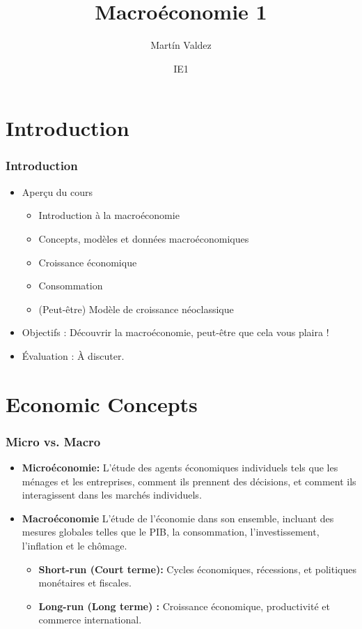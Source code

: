 \documentclass{beamer}
\title{Macroéconomie 1}
\author{Mart\'in Valdez}
\date{IE1}
\begin{document}
\begin{frame}
\titlepage
\end{frame}



\section{Introduction}
\begin{frame}
    \frametitle{Introduction}
    \begin{itemize}
        \item Aperçu du cours
        \begin{itemize}
            \item Introduction à la macroéconomie
            \item Concepts, modèles et données macroéconomiques
            \item Croissance économique
            \item Consommation
            \item (Peut-être) Modèle de croissance néoclassique
        \end{itemize}
        \item Objectifs : Découvrir la macroéconomie, peut-être que cela vous plaira !
        \item Évaluation : À discuter.
    \end{itemize}
\end{frame}
\section{Economic Concepts}
\begin{frame}
\frametitle{Micro vs. Macro}
\begin{itemize}
    \item \textbf{Microéconomie:}
    L'étude des agents économiques individuels tels que les ménages et les entreprises,
    comment ils prennent des décisions, et comment ils interagissent dans les marchés individuels.
    \pause
    \item \textbf{Macroéconomie}
    L'étude de l'économie dans son ensemble, incluant des mesures globales telles que
    le PIB, la consommation, l'investissement, l'inflation et le chômage.
    \begin{itemize}
        \item \textbf{Short-run (Court terme):} Cycles économiques, récessions, et politiques monétaires et fiscales.\pause
        \item \textbf{Long-run (Long terme) :} Croissance économique, productivité et commerce international.
    \end{itemize}
\end{itemize}
\end{frame}
\end{document}
